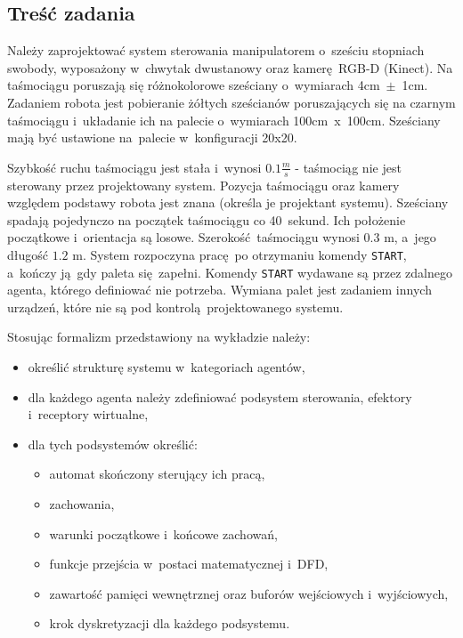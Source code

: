 \subsection{Treść zadania}
\label{subsec:polecenie}
Należy zaprojektować system sterowania manipulatorem o~sześciu stopniach swobody, wyposażony w~chwytak dwustanowy oraz kamerę RGB-D (Kinect). Na taśmociągu poruszają się różnokolorowe sześciany o~wymiarach 4cm~$\pm$~1cm. Zadaniem robota jest pobieranie żółtych sześcianów poruszających się na czarnym taśmociągu i~układanie ich na palecie o~wymiarach 100cm~x~100cm. Sześciany mają być ustawione na~palecie w~konfiguracji 20x20. 

Szybkość ruchu taśmociągu jest stała i~wynosi $\num{0,1}\frac{m}{s}$ - taśmociąg nie jest sterowany przez projektowany system. Pozycja taśmociągu oraz kamery względem podstawy robota jest znana (określa je projektant systemu). Sześciany spadają pojedynczo na początek taśmociągu co 40~sekund. Ich położenie początkowe i~orientacja są losowe. Szerokość taśmociągu wynosi $\num{0.3}$ m, a~jego długość $\num{1,2}$ m. System rozpoczyna pracę po otrzymaniu komendy \texttt{START}, a~kończy ją gdy paleta się zapełni. Komendy \texttt{START} wydawane są przez zdalnego agenta, którego definiować nie potrzeba. Wymiana palet jest zadaniem innych urządzeń, które nie są pod kontrolą projektowanego systemu.

Stosując formalizm przedstawiony na wykładzie należy:
\begin{itemize}
    \item określić strukturę systemu w~kategoriach agentów,
    \item dla każdego agenta należy zdefiniować podsystem sterowania, efektory i~receptory wirtualne,
    \item dla tych podsystemów określić:
    \begin{itemize}
        \item automat skończony sterujący ich pracą,
        \item zachowania,
        \item warunki początkowe i~końcowe zachowań,
        \item funkcje przejścia w~postaci matematycznej i~DFD,
        \item zawartość pamięci wewnętrznej oraz buforów wejściowych i~wyjściowych,
        \item krok dyskretyzacji dla każdego podsystemu.
    \end{itemize}
\end{itemize}
